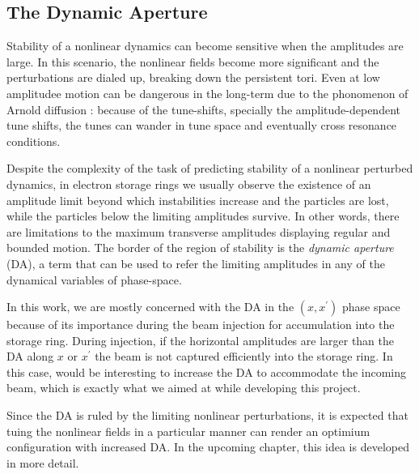 \subsection{The Dynamic Aperture}
    Stability of a nonlinear dynamics can become sensitive when the amplitudes are large. In this scenario, the nonlinear fields become more significant and the perturbations are dialed up, breaking down the persistent tori. Even at low amplitudee motion can be dangerous in the long-term due to the phonomenon of Arnold diffusion \cite{wolski_beam_2014, arnold_instability1964}: because of the tune-shifts, specially the amplitude-dependent tune shifts, the tunes can wander in tune space and eventually cross resonance conditions.

    Despite the complexity of the task of predicting stability of a nonlinear perturbed dynamics, in electron storage rings we usually observe the existence of an amplitude limit beyond which instabilities increase and the particles are lost, while the particles below the limiting amplitudes survive. In other words, there are limitations to the maximum transverse amplitudes displaying regular and bounded motion. The border of the region of stability is the \textit{dynamic aperture} (\acrshort*{DA}), a term that can be used to refer the limiting amplitudes in any of the dynamical variables of phase-space.

    In this work, we are mostly concerned with the \gls*{DA} in the $(x, x^\prime)$ phase space because of its importance during the beam injection for accumulation into the storage ring.  During injection, if the horizontal amplitudes  are larger than the \gls*{DA} along $x$ or $x^\prime$ the beam is not captured  efficiently into the storage ring. In this case, would be interesting to increase the \gls*{DA} to accommodate the incoming beam, which is exactly what we aimed at while developing this project.

    Since the \gls*{DA} is ruled by the limiting nonlinear perturbations, it is expected that tuing the nonlinear fields in a particular manner can render an optimium configuration with increased \gls*{DA}.  In the upcoming chapter, this idea is developed in more detail.
